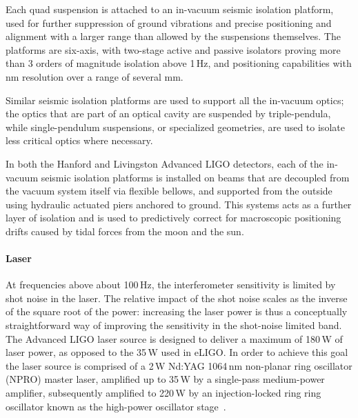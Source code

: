 Each quad suspension is attached to an in-vacuum seismic isolation platform, 
used for further suppression of ground vibrations and precise positioning and 
alignment with a larger range than allowed by the suspensions themselves. The 
platforms are six-axis, with two-stage active and passive isolators proving more 
than 3 orders of magnitude isolation above 1\,Hz, and positioning capabilities 
with nm resolution over a range of several mm.

Similar seismic isolation platforms are used to support all the in-vacuum optics; 
the optics that are part of an optical cavity are suspended by triple-pendula, while 
single-pendulum suspensions, or specialized geometries, are used to isolate 
less critical optics where necessary.

In both the Hanford and Livingston Advanced LIGO detectors, 
each of the in-vacuum seismic isolation platforms is 
installed on beams that are decoupled from the vacuum system itself via 
flexible bellows, and supported from the outside using hydraulic actuated 
piers anchored to ground. This systems acts as a further layer of isolation 
and is used to predictively correct for macroscopic positioning drifts caused 
by tidal forces from the moon and the sun.


\paragraph*{Laser}
At frequencies above about 100\,Hz, the interferometer sensitivity is limited by shot 
noise in the laser. The relative impact of the shot noise scales as the inverse of the 
square root of the power: increasing the laser power is thus a conceptually 
straightforward way of improving the sensitivity in the shot-noise limited band. 
The Advanced LIGO laser source is designed to deliver a maximum of 180\,W of 
laser power, as opposed to the 35\,W used in eLIGO. 
In order to achieve this goal the laser source is comprised of a 2\,W Nd:YAG 1064\,nm non-planar ring oscillator (NPRO) 
master laser, amplified up to 35\,W by a single-pass medium-power amplifier, subsequently amplified to 220\,W by an 
injection-locked ring ring oscillator known as the high-power oscillator stage~\cite{Kwee_2012}. 

